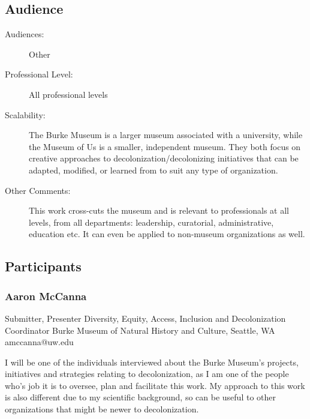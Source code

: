 \documentclass{report}
\begin{document}
              \subsection*{Audience}
                \begin{description}
                  \item [Audiences:]Other~
                  \item[Professional Level:]All professional levels~
                \item[Scalability:] The Burke Museum is a larger museum associated with a university, while the Museum of Us is a smaller, independent museum. They both focus on creative approaches to decolonization/decolonizing initiatives that can be adapted, modified, or learned from to suit any type of organization.

							
              \item[Other Comments:] This work cross-cuts the museum and is relevant to professionals at all levels, from all departments: leadership, curatorial, administrative, education etc. It can even be applied to non-museum organizations as well.
              \end{description}
            \subsection*{Participants}
              \subsubsection*{ Aaron McCanna }
              Submitter, Presenter\newline
              Diversity, Equity, Access, Inclusion and Decolonization Coordinator\newline
              Burke Museum of Natural History and Culture, Seattle, WA
              \newline
              amccanna@uw.edu\newline
              
              

              I will be one of the individuals interviewed about the Burke Museum's projects, initiatives and strategies relating to decolonization, as I am one of the people who's job it is to oversee, plan and facilitate this work. My approach to this work is also different due to my scientific background, so can be useful to other organizations that might be newer to decolonization.\newline
\end{document}
